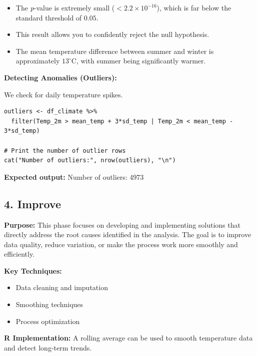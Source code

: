 \begin{itemize}
    \item The \emph{p}-value is extremely small ($< 2.2 \times 10^{-16}$), which is far below the standard threshold of $0.05$.
    
    \item This result allows you to confidently reject the null hypothesis.
    
    \item The mean temperature difference between summer and winter is approximately $13^\circ$C, with summer being significantly warmer.
\end{itemize}

\textbf{Detecting Anomalies (Outliers):}

We check for daily temperature spikes.

\begin{verbatim}
outliers <- df_climate %>%
  filter(Temp_2m > mean_temp + 3*sd_temp | Temp_2m < mean_temp - 3*sd_temp)

# Print the number of outlier rows
cat("Number of outliers:", nrow(outliers), "\n")
\end{verbatim}

\textbf{Expected output:} Number of outliers: 4973

\subsection*{4. Improve}

\textbf{Purpose:} This phase focuses on developing and implementing solutions that directly address the root causes identified in the analysis. The goal is to improve data quality, reduce variation, or make the process work more smoothly and efficiently.

\textbf{Key Techniques:}
\begin{itemize}
  \item Data cleaning and imputation
  \item Smoothing techniques
  \item Process optimization
\end{itemize}

\textbf{R Implementation:} A rolling average can be used to smooth temperature data and detect long-term trends.

